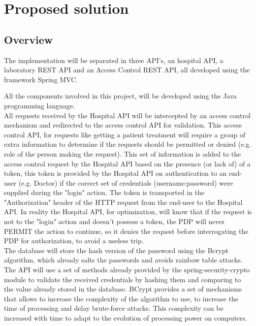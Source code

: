 \section{Proposed solution}

\subsection{Overview}

The implementation will be separated in three API's, an hospital API, a laboratory REST API and an Access Control REST API, all developed using the framework Spring MVC\cite{springmvc}.

All the components involved in this project, will be developed using the Java\cite{java} programming language. \\

All requests received by the Hospital API will be intercepted by an access control mechanism and redirected to the access control API for validation. This access control API, for requests like getting a patient treatment will require a group of extra information to determine if the requests should be permitted or denied (e.g. role of the person making the request).
This set of information is added to the access control request by the Hospital API based on the presence (or lack of) of a token, this token is provided by the Hospital API on authentication to an end-user (e.g. Doctor) if the correct set of credentials (username:password) were supplied during the "login" action. The token is transported in the "Authorization" header of the HTTP request from the end-user to the Hospital API. In reality the Hospital API, for optimization, will know that if the request is not to the "login" action and doesn't possess a token, the PDP will never PERMIT the action to continue, so it denies the request before interrogating the PDP for authorization, to avoid a useless trip. \\

The database will store the hash version of the password using the Bcrypt\cite{bcrypt} algorithm, which already salts the passwords and avoids rainbow table attacks. The API will use a set of methods already provided by the spring-security-crypto\cite{springsecuritycrypto} module to validate the received credentials by hashing them and comparing to the value already stored in the database. BCrypt provides a set of mechanisms that allows to increase the complexity of the algorithm to use, to increase the time of processing and delay brute-force attacks. This complexity can be increased with time to adapt to the evolution of processing power on computers. \\


